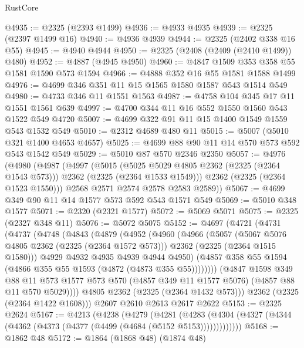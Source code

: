 \begin{lexlean}{RustCore}
\begin{coremodule}
@4935 := @2325 (@2393 @1499)
@4936 := @4933 @4935
@4939 := @2325 (@2397 @1499 @16)
@4940 := @4936 @4939
@4944 := @2325 (@2402 @338 @16 @55)
@4945 := @4940 @4944
@4950 := @2325 (@2408 (@2409 (@2410 @1499)) @480)
@4952 := @4887 (@4945 @4950)
@4960 := @4847 @1509 @353 @358 @55 @1581 @1590 @573 @1594
@4966 := @4888 @352 @16 @55 @1581 @1588 @1499
@4976 := @4699 @346 @351 @11 @15 @1565 @1580 @1587 @543 @1514 @549
@4980 := @4733 @346 @11 @1551 @1563
@4987 := @4758 @104 @345 @17 @11 @1551 @1561 @639
@4997 := @4700 @344 @11 @16 @552 @1550 @1560 @543 @1522 @549 @4720
@5007 := @4699 @322 @91 @11 @15 @1400 @1549 @1559 @543 @1532 @549
@5010 := @2312 @4689 @480 @11
@5015 := @5007 (@5010 @321 @1400 @4653 @4657)
@5025 := @4699 @88 @90 @11 @14 @570 @573 @592 @543 @1542 @549
@5029 := @5010 @87 @570 @2346 @2350
@5057 := @4976
    (@4980
      (@4987
        (@4997
          (@5015
            (@5025 @5029 @4805 @2362 (@2325 (@2364 @1543 @573)))
            @2362
            (@2325 (@2364 @1533 @1549)))
          @2362
          (@2325 (@2364 @1523 @1550)))
        @2568
        @2571
        @2574
        @2578
        @2583
        @2589))
@5067 := @4699 @349 @90 @11 @14 @1577 @573 @592 @543 @1571 @549
@5069 := @5010 @348 @1577
@5071 := @2320 (@2321 @1577)
@5072 := @5069 @5071
@5075 := @2325 (@2327 @348 @11)
@5076 := @5072 @5075
@5152 := @4697
    (@4721
      (@4731
        (@4737
          (@4748
            (@4843
              (@4879
                (@4952
                  (@4960
                    (@4966
                      (@5057
                        (@5067 @5076 @4805 @2362 (@2325 (@2364 @1572 @573)))
                        @2362
                        (@2325 (@2364 @1515 @1580)))
                      @4929
                      @4932
                      @4935
                      @4939
                      @4944
                      @4950)
                    (@4857 @358 @55 @1594 (@4866 @355 @55 @1593 (@4872 (@4873 @355 @55))))))))
            (@4847
              @1598
              @349
              @88
              @11
              @573
              @1577
              @573
              @570
              (@4857 @349 @11 @1577 @5076)
              (@4857 @88 @11 @570 @5029))))
        @4805
        @2362
        (@2325 (@2364 @1432 @573)))
      @2362
      (@2325 (@2364 @1422 @1608)))
    @2607
    @2610
    @2613
    @2617
    @2622
@5153 := @2325 @2624
@5167 := @4213
    (@4238
      (@4279
        (@4281
          (@4283 (@4304 (@4327 (@4344 (@4362 (@4373 (@4377 (@4499 (@4684 (@5152 @5153)))))))))))))
@5168 := @1862 @48
@5172 := @1864 (@1868 @48) (@1874 @48)

\end{coremodule}
\end{lexlean}
